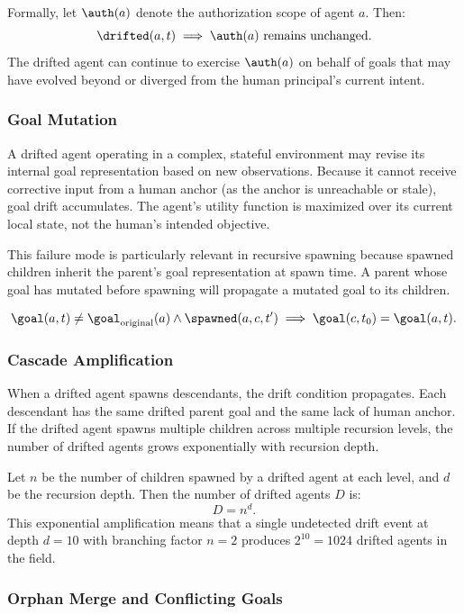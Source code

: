 Formally, let $\auth(a)$ denote the authorization scope of agent $a$. Then:
\[
\drifted(a, t) \implies \auth(a) \text{ remains unchanged}.
\]
The drifted agent can continue to exercise $\auth(a)$ on behalf of goals that may have evolved beyond or diverged from the human principal's current intent.

\subsubsection{Goal Mutation}

A drifted agent operating in a complex, stateful environment may revise its internal goal representation based on new observations. Because it cannot receive corrective input from a human anchor (as the anchor is unreachable or stale), goal drift accumulates. The agent's utility function is maximized over its current local state, not the human's intended objective.

This failure mode is particularly relevant in recursive spawning because spawned children inherit the parent's goal representation at spawn time. A parent whose goal has mutated before spawning will propagate a mutated goal to its children.

\[
\goal(a, t) \neq \goal_{\text{original}}(a) \land \spawned(a, c, t') \implies \goal(c, t_0) = \goal(a, t).
\]

\subsubsection{Cascade Amplification}

When a drifted agent spawns descendants, the drift condition propagates. Each descendant has the same drifted parent goal and the same lack of human anchor. If the drifted agent spawns multiple children across multiple recursion levels, the number of drifted agents grows exponentially with recursion depth.

Let $n$ be the number of children spawned by a drifted agent at each level, and $d$ be the recursion depth. Then the number of drifted agents $D$ is:
\[
D = n^d.
\]
This exponential amplification means that a single undetected drift event at depth $d=10$ with branching factor $n=2$ produces $2^{10} = 1024$ drifted agents in the field.

\subsubsection{Orphan Merge and Conflicting Goals}

